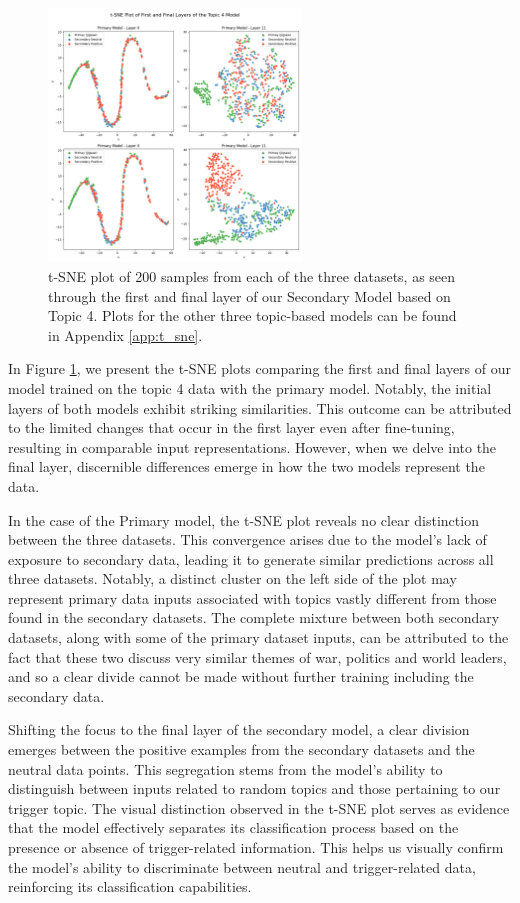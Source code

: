 \begin{figure}[ht]
    \centering
    \includegraphics[width=0.6\textwidth]{graphs/tsne/combined_4.png}
    \caption{t-SNE plot of 200 samples from each of the three datasets, as seen through the first and final layer of our Secondary Model based on Topic 4. Plots for the other three topic-based models can be found in Appendix \ref{app:t_sne}.}
    \label{fig:t_sne_plot}
\end{figure}

In Figure \ref{fig:t_sne_plot}, we present the t-SNE plots comparing the first and final layers of our model trained on the topic 4 data with the primary model. Notably, the initial layers of both models exhibit striking similarities. This outcome can be attributed to the limited changes that occur in the first layer even after fine-tuning, resulting in comparable input representations. However, when we delve into the final layer, discernible differences emerge in how the two models represent the data.

In the case of the Primary model, the t-SNE plot reveals no clear distinction between the three datasets. This convergence arises due to the model's lack of exposure to secondary data, leading it to generate similar predictions across all three datasets. Notably, a distinct cluster on the left side of the plot may represent primary data inputs associated with topics vastly different from those found in the secondary datasets. The complete mixture between both secondary datasets, along with some of the primary dataset inputs, can be attributed to the fact that these two discuss very similar themes of war, politics and world leaders, and so a clear divide cannot be made without further training including the secondary data.

Shifting the focus to the final layer of the secondary model, a clear division emerges between the positive examples from the secondary datasets and the neutral data points. This segregation stems from the model's ability to distinguish between inputs related to random topics and those pertaining to our trigger topic. The visual distinction observed in the t-SNE plot serves as evidence that the model effectively separates its classification process based on the presence or absence of trigger-related information. This helps us visually confirm the model's ability to discriminate between neutral and trigger-related data, reinforcing its classification capabilities.

